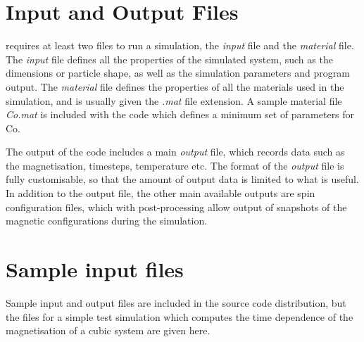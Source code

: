\section*{Input and Output Files}
\vampire requires at least two files to run a simulation, the \textit{input} file and the \textit{material} file. The \textit{input} file defines all the properties of the simulated system, such as the dimensions or particle shape, as well as the simulation parameters and program output. The \textit{material} file defines the properties of all the materials used in the simulation, and is usually given the \textit{.mat} file extension. A sample material file \textit{Co.mat} is included with the code which defines a minimum set of parameters for Co. 

The output of the code includes a main \textit{output} file, which records data such as the magnetisation, timesteps, temperature etc. The format of the \textit{output} file is fully customisable, so that the amount of output data is limited to what is useful. In addition to the output file, the other main available outputs are spin configuration files, which with post-processing allow output of snapshots of the magnetic configurations during the simulation.

\section*{Sample input files}
Sample input and output files are included in the source code distribution, but the files for a simple test simulation which computes the time dependence of the magnetisation of a cubic system are given here.


